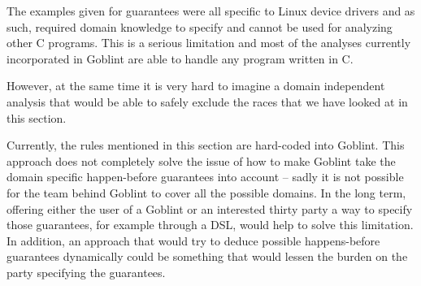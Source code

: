 \documentclass[..thesis.tex]{subfiles}
\begin{document}

The examples given for guarantees were all specific to Linux device drivers and as such, required domain knowledge to specify and cannot be used for analyzing other C programs.
This is a serious limitation and most of the analyses currently incorporated in Goblint are able to handle any program written in C. 


However, at the same time it is very hard to imagine a domain independent analysis that would be able to safely exclude the races that we have looked at in this section.

Currently, the rules mentioned in this section are hard-coded into Goblint. This approach does not completely solve the issue of how to make Goblint take the domain specific happen-before
guarantees into account -- sadly it is not possible for the team behind Goblint to cover all the possible domains.
In the long term, offering either the user of a Goblint or an interested thirty party a way to specify those guarantees,
for example through a DSL,  would help to solve this limitation. In addition, an approach that would try to deduce possible happens-before guarantees dynamically 
could be something that would lessen the burden on the party specifying the guarantees.

\end{document}
